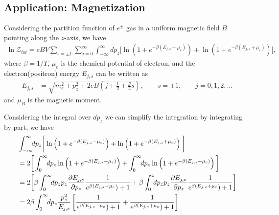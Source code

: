 \documentclass[sn-mathphys,Numbered]{sn-jnl}
\theoremstyle{thmstyleone}%
\theoremstyle{thmstyletwo}%
\theoremstyle{thmstylethree}%
\begin{document}
\subsection{Application: Magnetization}
Considering the partition function of $e^\pm$ gas in a uniform magnetic field $B$ pointing along the $z$-axis, we have
\begin{align}
\ln\mathcal{Z}_{tot}=eBV\sum_{s=\pm1}\sum_{j=0}^\infty\int^\infty_{-\infty} \!\!dp_z\bigg[\ln\left(1+e^{-\beta(E_{j,s}-\mu_e)}\right)+\ln\left(1+e^{-\beta(E_{j,s}+\mu_e)}\right)\bigg],
\end{align}
where $\beta=1/T$, $\mu_e$ is the chemical potential of electron, and the electron(positron) energy $E_{j,s}$ can be written as
\begin{align}
E_{j,s}&=\sqrt{m^2_e+p^2_z+2eB\left(j+\frac{1}{2}+\frac{g}{4}s\right)},\qquad s=\pm1,\qquad j=0,1,2,\dots
\end{align}
and $\mu_B$ is the magnetic moment. 

Considering the integral over $dp_z$ we can simplify the integration by integrating by part, we have
\begin{align}
&\int^\infty_{-\infty} \!\!dp_z\bigg[\ln\left(1+e^{-\beta(E_{j,s}-\mu_e)}\right)+\ln\left(1+e^{-\beta(E_{j,s}+\mu_e)}\right)\bigg]\notag\\
&=2\bigg[\int_0^\infty\!\!dp_z\ln\left(1+e^{-\beta(E_{j,s}-\mu_e)}\right)+\int_0^\infty\!\!dp_z\ln\left(1+e^{-\beta(E_{j,s}+\mu_e)}\right)\bigg]\\
&=2\bigg[\beta\int_0^\infty\!\!dp_z p_z\frac{\partial E_{j,s}}{\partial p_z}\frac{1}{e^{\beta(E_{j,s}-\mu_e})+1}+\beta\int_0^z\!\!dp_z p_z\frac{\partial E_{j,s}}{\partial p_z}\frac{1}{e^{\beta(E_{j,s}+\mu_e})+1}\bigg]\\
&=2\beta\int_0^\infty\!\!dp_z \frac{p_z^2}{E_{j,s}}\left[\frac{1}{e^{\beta(E_{j,s}-\mu_e})+1}+\frac{1}{e^{\beta(E_{j,s}+\mu_e})+1}\right]
\end{align}
\end{document}

